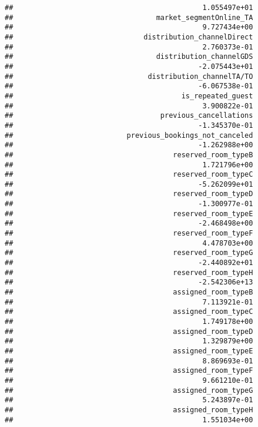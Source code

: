 \documentclass[
]{article}
\begin{document}
\begin{verbatim}
##                                             1.055497e+01 
##                                  market_segmentOnline_TA 
##                                             9.727434e+00 
##                               distribution_channelDirect 
##                                             2.760373e-01 
##                                  distribution_channelGDS 
##                                            -2.075443e+01 
##                                distribution_channelTA/TO 
##                                            -6.067538e-01 
##                                        is_repeated_guest 
##                                             3.900822e-01 
##                                   previous_cancellations 
##                                            -1.345370e-01 
##                           previous_bookings_not_canceled 
##                                            -1.262988e+00 
##                                      reserved_room_typeB 
##                                             1.721796e+00 
##                                      reserved_room_typeC 
##                                            -5.262099e+01 
##                                      reserved_room_typeD 
##                                            -1.300977e-01 
##                                      reserved_room_typeE 
##                                            -2.468498e+00 
##                                      reserved_room_typeF 
##                                             4.478703e+00 
##                                      reserved_room_typeG 
##                                            -2.440892e+01 
##                                      reserved_room_typeH 
##                                            -2.542306e+13 
##                                      assigned_room_typeB 
##                                             7.113921e-01 
##                                      assigned_room_typeC 
##                                             1.749178e+00 
##                                      assigned_room_typeD 
##                                             1.329879e+00 
##                                      assigned_room_typeE 
##                                             8.869693e-01 
##                                      assigned_room_typeF 
##                                             9.661210e-01 
##                                      assigned_room_typeG 
##                                             5.243897e-01 
##                                      assigned_room_typeH 
##                                             1.551034e+00 

\end{verbatim}
\end{document}
